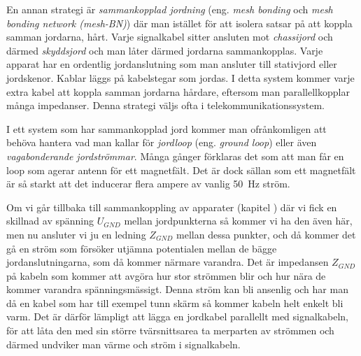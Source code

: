 En annan strategi är \emph{sammankopplad jordning} (eng. \emph{mesh bonding}
och \emph{mesh bonding network (mesh-BN)}) \cite[kap 3.2.3]{K27-1991}
där man istället för att isolera satsar på att koppla samman jordarna, hårt.
Varje signalkabel sitter ansluten mot \emph{chassijord} och därmed
\emph{skyddsjord} och man låter därmed jordarna sammankopplas.
Varje apparat har en ordentlig jordanslutning som man ansluter till stativjord
eller jordskenor.
Kablar läggs på kabelstegar som jordas.
I detta system kommer varje extra kabel att koppla samman jordarna hårdare,
eftersom man parallellkopplar många impedanser.
Denna strategi väljs ofta i telekommunikationssystem.


\noindent
I ett system som har sammankopplad jord kommer man ofrånkomligen att behöva
hantera vad man kallar för \emph{jordloop} (eng. \emph{ground loop}) eller även
\emph{vagabonderande jordströmmar}.
Många gånger förklaras det som att man får en loop som agerar antenn för ett
magnetfält.
Det är dock sällan som ett magnetfält är så starkt att det inducerar flera
ampere av vanlig \qty{50}{\hertz} ström.

Om vi går tillbaka till sammankoppling av apparater (kapitel
) där vi fick en skillnad av spänning \(U_{GND}\)
mellan jordpunkterna så kommer vi ha den även här, men nu ansluter vi ju en
ledning \(Z_{GND}\) mellan dessa punkter, och då kommer det gå en ström som
försöker utjämna potentialen mellan de bägge jordanslutningarna, som då kommer
närmare varandra.
Det är impedansen \(Z_{GND}\) på kabeln som kommer att avgöra hur stor strömmen
blir och hur nära de kommer varandra spänningsmässigt.
Denna ström kan bli ansenlig och har man då en kabel som har till exempel tunn
skärm så kommer kabeln helt enkelt bli varm.
Det är därför lämpligt att lägga en jordkabel parallellt med signalkabeln, för
att låta den med sin större tvärsnittsarea ta merparten av strömmen och därmed
undviker man värme och ström i signalkabeln.

